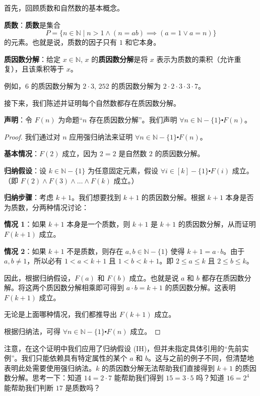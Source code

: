 \begin{example}\label{ex:example5.4.3}
    首先，回顾质数和自然数的基本概念。

    \textbf{质数}：\textbf{质数}是集合
    \[P = \{n \in \mathbb{N} \mid n > 1 \land (n = ab) \implies (a = 1 \lor a = n)\}\]
    的元素。也就是说，质数的因子只有 $1$ 和它本身。

    \textbf{质因数分解}：给定 $x \in \mathbb{N}$, $x$ 的\textbf{质因数分解}是将 $x$ 表示为质数的乘积（允许重复），且该乘积等于 $x$。

    例如，$6$ 的质因数分解为 $2 \cdot 3$, $252$ 的质因数分解为 $2 \cdot 2 \cdot 3 \cdot 3 \cdot 7$。

    接下来，我们陈述并证明每个自然数都存在质因数分解。

    \textbf{声明}：令 $F(n)$ 为命题``$n$ 存在质因数分解''。我们声明 $\forall n \in \mathbb{N} - \{1\} \centerdot F(n)$。

    \begin{proof}
        我们通过对 $n$ 应用强归纳法来证明 $\forall n \in \mathbb{N} - \{1\} \centerdot F(n)$。

        \textbf{基本情况}：$F(2)$ 成立，因为 $2 = 2$ 是自然数 $2$ 的质因数分解。

        \textbf{归纳假设}：设 $k \in \mathbb{N} - \{1\}$ 为任意固定元素，假设 $\forall i \in [k]-\{1\} \centerdot F(i)$ 成立。（即 $F(2) \land F(3) \land \dots \land F(k)$ 成立。）

        \textbf{归纳步骤}：考虑 $k+1$。我们想要找到 $k+1$ 的质因数分解。根据 $k+1$ 本身是否为质数，分两种情况讨论：

        \textbf{情况 1}：如果 $k+1$ 本身是一个质数，则 $k+1$ 是 $k+1$ 的质因数分解，从而证明 $F(k+1)$ 成立。

        \textbf{情况 2}：如果 $k+1$ 不是质数，则存在 $a, b \in \mathbb{N} - \{1\}$ 使得 $k+1 = a \cdot b$。由于 $a, b \neq 1$，所以必有 $1 < a < k+1$ 且 $1 < b < k+1$。即 $2 \le a \le k$ 且 $2 \le b \le k$。

        因此，根据归纳假设，$F(a)$ 和 $F(b)$ 成立。也就是说 $a$ 和 $b$ 都存在质因数分解。将这两个质因数分解相乘即可得到 $a \cdot b = k+1$ 的质因数分解。这表明 $F(k+1)$ 成立。

        无论是上面哪种情况，我们都推导出 $F(k+1)$ 成立。

        根据归纳法，可得 $\forall n \in \mathbb{N} - \{1\} \centerdot F(n)$ 成立。
    \end{proof}
\end{example}

注意，在这个证明中我们应用了归纳假设 (IH)，但并未指定具体引用的``先前实例''。我们只能依赖具有特定属性的某个 $a$ 和 $b$。这与之前的例子不同，但清楚地表明此处需要使用强归纳法。$k$ 的质因数分解无法帮助我们直接得到 $k+1$ 的质因数分解。思考一下：知道 $14 = 2 \cdot 7$ 能帮助我们得到 $15 = 3 \cdot 5$ 吗？知道 $16 = 2^4$ 能帮助我们判断 $17$ 是质数吗？

